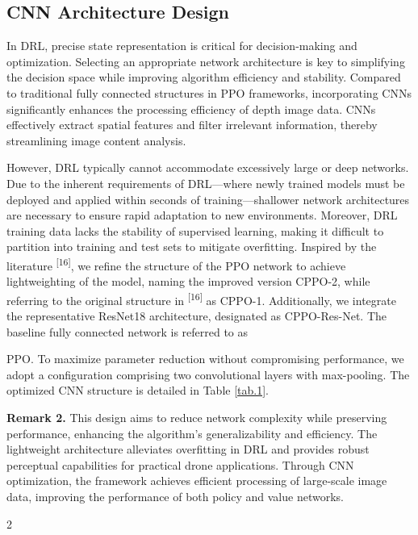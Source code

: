 \documentclass{aas}
\begin{document}
\subsection{CNN Architecture Design}

In DRL, precise state representation is critical for decision-making and optimization. Selecting an appropriate network architecture is key to simplifying the decision space while improving algorithm efficiency and stability. Compared to traditional fully connected structures in PPO frameworks, incorporating CNNs significantly enhances the processing efficiency of depth image data. CNNs effectively extract spatial features and filter irrelevant information, thereby streamlining image content analysis.

However, DRL typically cannot accommodate excessively large or deep networks. Due to the inherent requirements of DRL—where newly trained models must be deployed and applied within seconds of training—shallower network architectures are necessary to ensure rapid adaptation to new environments. Moreover, DRL training data lacks the stability of supervised learning, making it difficult to partition into training and test sets to mitigate overfitting. Inspired by the literature \textsuperscript{[16]}, we refine the structure of the PPO network to achieve lightweighting of the model, naming the improved version CPPO-2, while referring to the original structure in \textsuperscript{[16]} as CPPO-1. Additionally, we integrate the representative ResNet18 architecture, designated as CPPO-Res-Net. The baseline fully connected network is referred to as {PPO. To maximize parameter reduction without compromising performance, we adopt a configuration comprising two convolutional layers with max-pooling. The optimized CNN structure is detailed in Table \ref{tab.1}.


\textbf{Remark 2.} This design aims to reduce network complexity while preserving performance, enhancing the algorithm's generalizability and efficiency. The lightweight architecture alleviates overfitting in DRL and provides robust perceptual capabilities for practical drone applications. Through CNN optimization, the framework achieves efficient processing of large-scale image data, improving the performance of both policy and value networks.

\onecolumn\begin{multicols}{2}%





\end{multicols}}
\end{document}
